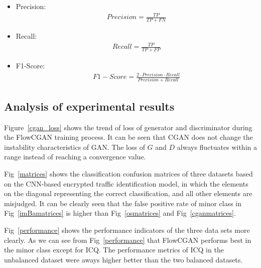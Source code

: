 \documentclass[conference]{IEEEtran}
\begin{document}
\begin{itemize}
\item Precision:
	\begin{equation}
	\begin{split}
	\label{Precision}
 	Precision=\frac{TP}{TP+FN}
	\end{split}
	\end{equation}
\item Recall:
	\begin{equation}
	\begin{split}
	\label{Recall}
 	Recall=\frac{TP}{TP+FP}
	\end{split}
	\end{equation}
\item F1-Score:
	\begin{equation}
	\begin{split}
	\label{Recall}
 	F1-Score=\frac{2\cdot{Precision}\cdot{Recall}}{Precision+Recall}
	\end{split}
	\end{equation}

\end{itemize}

\subsection {Analysis of experimental results}
Figure~\ref{cgan_loss} shows the trend of loss of generator and discriminator during the FlowCGAN training process. It can be seen that CGAN does not change the instability characteristics of GAN. The loss of $G$ and $D$ always fluctuates within a range instead of reaching a convergence value.

Fig~\ref{matrices} shows the classification confusion matrices of three datasets based on the CNN-based encrypted traffic identification model, in which the elements on the diagonal representing the correct classification, and all other elements are misjudged. It can be clearly seen that the false positive rate of minor class in Fig~\ref{imBamatrices} is higher than Fig~\ref{osmatrices} and Fig~\ref{cganmatrices}.

Fig~\ref{performance} shows the performance indicators of the three data sets more clearly. As we can see from Fig~\ref{performance} that FlowCGAN performs best in the minor class except for ICQ. The performance metrics of ICQ in the unbalanced dataset were aways higher better than the two balanced datasets.
\end{document}
